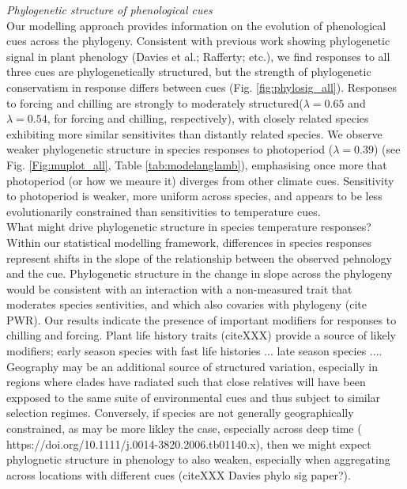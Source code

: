 \documentclass{article}\usepackage[]{graphicx}\usepackage[]{color}
\begin{document}
\emph{Phylogenetic structure of phenological cues}\\
Our modelling approach provides information on the evolution of phenological cues across the phylogeny. Consistent with previous work showing phylogenetic signal in plant phenology (Davies et al.; Rafferty; etc.), we find responses to all three cues are phylogenetically structured, but the strength of phylogenetic conservatism in response differs between cues (Fig. \ref{fig:phylosig_all}). Responses to forcing and chilling are strongly to moderately structured($\lambda = 0.65$ and $\lambda = 0.54$, for forcing and chilling, respectively), with closely related species exhibiting more similar sensitivites than distantly related species. We observe weaker phylogenetic structure in species responses to photoperiod ($\lambda= 0.39$) (see Fig. \ref{Fig:muplot_all}, Table \ref{tab:modelanglamb}), emphasising once more that photoperiod (or how we meaure it) diverges from other climate cues. Sensitivity to photoperiod is weaker, more uniform across species, and appears to be less evolutionarily constrained than sensitivities to temperature cues. \\

What might drive phylogenetic structure in species temperature responses? Within our statistical modelling framework, differences in species responses represent shifts in the slope of the relationship between the observed pehnology and the cue. Phylogenetic structure in the change in slope across the phylogeny would be consistent with an interaction with a non-measured trait that moderates species sentivities, and which also covaries with phylogeny (cite PWR). Our results indicate the presence of important modifiers for responses to chilling and forcing. Plant life history traits (citeXXX) provide a source of likely modifiers; early season species with fast life histories ... late season species .... Geography may be an additional source of structured variation, especially in regions where clades have radiated such that close relatives will have been expposed to the same suite of environmental cues and thus subject to similar selection regimes. Conversely, if species are not generally geographically constrained, as may be more likley the case, especially across deep time ( https://doi.org/10.1111/j.0014-3820.2006.tb01140.x), then we might expect phylognetic structure in phenology to also weaken, especially when aggregating across locations with different cues (citeXXX Davies phylo sig paper?).
\\
\end{document}
